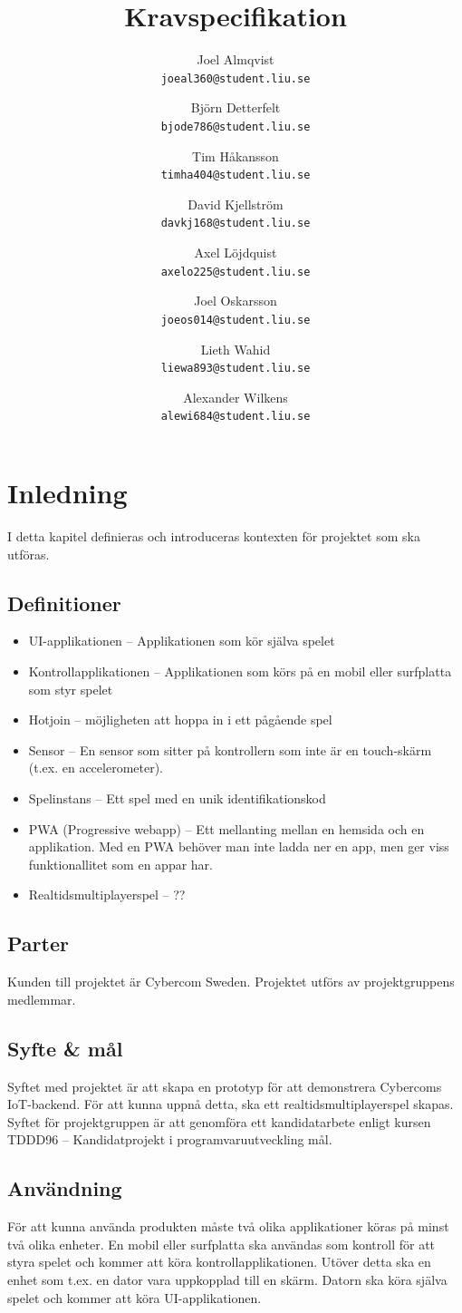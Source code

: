 \documentclass[10pt]{article}
\title{Kravspecifikation}
\author{
    Joel Almqvist\\
    \texttt{joeal360@student.liu.se}
    \and
    Björn Detterfelt\\
    \texttt{bjode786@student.liu.se}
    \and
    Tim Håkansson\\
    \texttt{timha404@student.liu.se}
    \and
    David Kjellström\\
    \texttt{davkj168@student.liu.se}
    \and
    Axel Löjdquist\\
    \texttt{axelo225@student.liu.se}
    \and
    Joel Oskarsson\\
    \texttt{joeos014@student.liu.se}
    \and
    Lieth Wahid\\
    \texttt{liewa893@student.liu.se}
    \and
    Alexander Wilkens\\
    \texttt{alewi684@student.liu.se}
}
\begin{document}
\maketitle
\pagebreak
\tableofcontents
\pagebreak
\section{Inledning}
	I detta kapitel definieras och introduceras kontexten för projektet som ska utföras.

	\subsection{Definitioner}
		\begin{itemize}
		\item UI-applikationen -- Applikationen som kör själva spelet
		\item Kontrollapplikationen -- Applikationen som körs på en mobil eller surfplatta som styr spelet
		\item Hotjoin -- möjligheten att hoppa in i ett pågående spel
		\item Sensor -- En sensor som sitter på kontrollern som inte är en touch-skärm (t.ex. en accelerometer).
		\item Spelinstans -- Ett spel med en unik identifikationskod
		\item PWA (Progressive webapp) -- Ett mellanting mellan en hemsida och en applikation. Med en PWA behöver man inte ladda ner en app, men ger viss funktionallitet som en appar har.
		\item Realtidsmultiplayerspel -- ??
		\end{itemize}	

	\subsection{Parter}
	Kunden till projektet är Cybercom Sweden. Projektet utförs av projektgruppens medlemmar.
	
	\subsection{Syfte \& mål}
		Syftet med projektet är att skapa en prototyp för att demonstrera Cybercoms IoT-backend. För att kunna uppnå detta, ska ett realtidsmultiplayerspel skapas. Syftet för projektgruppen är att genomföra ett kandidatarbete enligt kursen TDDD96 -- Kandidatprojekt i programvaruutveckling mål.
	
	\subsection{Användning}
		För att kunna använda produkten måste två olika applikationer köras på minst två olika enheter. En mobil eller surfplatta ska användas som kontroll för att styra spelet och kommer att köra kontrollapplikationen. Utöver detta ska en enhet som t.ex. en dator vara uppkopplad till en skärm. Datorn ska köra själva spelet och kommer att köra UI-applikationen.  
	
\end{document}
